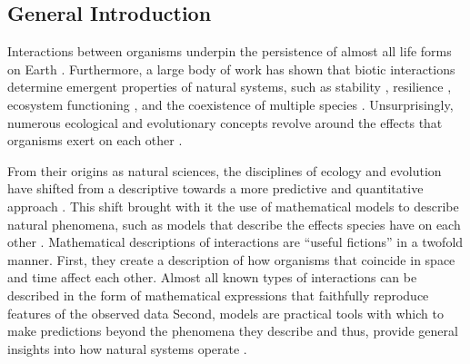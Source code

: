 \begin{refsection}
\chapter{General Introduction} %
\label{Intro}
Interactions between organisms underpin the persistence of almost all life forms on Earth \citep{lawton1999there}. Furthermore, a large body of work has shown that biotic interactions determine emergent properties of natural systems, such as stability \citep{may1972will, wootton2016many,song2018will}, resilience \citep{capdevila2021reconciling}, ecosystem functioning \citep{turnbull2013coexistence,godoy2020excess}, and the coexistence of multiple species \citep{chesson2000mechanisms,saavedra2017structural}. Unsurprisingly, numerous ecological and evolutionary concepts revolve around the effects that organisms exert on each other \citep{gause_experimental_1934,macarthur1967limiting,thompson1999evolution, hillerislambers2012rethinking, chase2009ecological,thompson2014interaction}.

From their origins as natural sciences, the disciplines of ecology and evolution have shifted from a descriptive towards a more predictive and quantitative approach \citep{holling1966strategy,pickett1980non,simberloff2004community,marquet2014theory,lassig2017predicting,rossberg2019let}. This shift brought with it the use of mathematical models to describe natural phenomena, such as models that describe the effects species have on each other \citep{holling1966strategy,levins1966strategy,maynard1978models,servedio2014not}. Mathematical descriptions of interactions are ``useful fictions'' \citep{box2011statistical} in a twofold manner. First, they create a description of how organisms that coincide in space and time affect each other. Almost all known types of interactions can be described in the form of mathematical expressions that faithfully reproduce features of the observed data \citep{volterra1926fluctuations,holling1959some,holt1977predation,adler2018competition,wood1999super,holland2002population,vazquez2005interaction,stouffer2021hidden}  Second, models are practical tools with which to make predictions beyond the phenomena they describe and thus, provide general insights into how natural systems operate \citep{sutherland2006predicting,stouffer2019all}.



\end{refsection}
